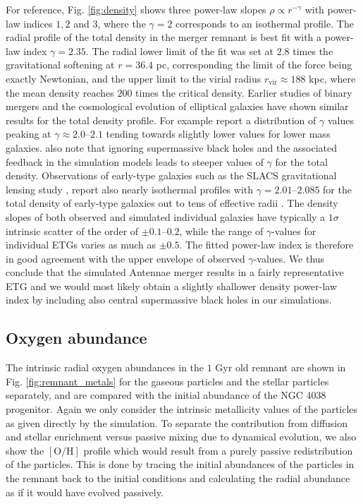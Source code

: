 \documentclass[a4paper,fleqn,usenatbib]{mnras}
\begin{document}
For reference, Fig. \ref{fig:density} shows three power-law
slopes $\rho \propto r^{-\gamma}$ with power-law indices $1, 2$ and $3$, 
where the $\gamma=2$ corresponds to an isothermal profile. The radial profile of the total density in the merger remnant is best
fit with a power-law index $\gamma=2.35$.
The radial lower limit of the fit was set at $2.8$ times the gravitational softening at $r=36.4$ pc, corresponding the limit of the
force being exactly Newtonian, and the upper limit to the virial radius $r_\mathrm{vir}\approx 188$ kpc, where the mean density reaches $200$ times
the critical density.
Earlier studies of binary mergers and the cosmological evolution of elliptical galaxies have shown 
similar results for the total density profile. For example 
\citet{2013ApJ...766...71R, 2017MNRAS.464.3742R} report a distribution of $\gamma$ values peaking at $\gamma\approx2.0$--$2.1$
tending towards slightly lower values for lower mass galaxies. \citet{2017MNRAS.464.3742R} also note 
that ignoring supermassive black holes and the associated feedback in the simulation models leads to steeper values of $\gamma$ 
for the total density.
Observations of early-type galaxies such as the SLACS gravitational lensing 
study \citep{2006ApJ...638..703B, 2008ApJ...682..964B},
report also nearly isothermal profiles with $\gamma=2.01$--$2.085$ for the total density of early-type galaxies 
\citep{2006ApJ...649..599K, 2009ApJ...703L..51K} out to tens of effective radii \citep{2007ApJ...667..176G}.
The density slopes of both observed and simulated individual galaxies have typically a $ 1\sigma$ intrinsic scatter
of the order of $\pm0.1$--$0.2$, while the range of $\gamma$-values for individual ETGs varies as much as $\pm0.5$.
The fitted power-law index is therefore in good agreement with the upper envelope of observed $\gamma$-values. We thus conclude
that the simulated Antennae merger results in a fairly representative ETG and we would most likely 
obtain a slightly shallower density power-law index by including also central supermassive black holes in our simulations.



\subsection{Oxygen abundance}

The intrinsic radial oxygen abundances in the $1$ Gyr old remnant are shown in Fig. \ref{fig:remnant_metals} for the gaseous particles and 
the stellar particles separately, and are compared with the initial abundance of the NGC 4038 progenitor. 
Again we only consider the intrinsic metallicity values of the particles
as given directly by the simulation.
To separate the contribution from diffusion and stellar enrichment versus 
passive mixing due to dynamical evolution, we also show the $[\mathrm{O}/\mathrm{H}]$ profile which would result from a purely
passive redistribution of the particles. This is done by tracing the initial abundances
of the particles in the remnant back to the initial conditions
and calculating the radial abundance as if it would have evolved passively.
\end{document}
